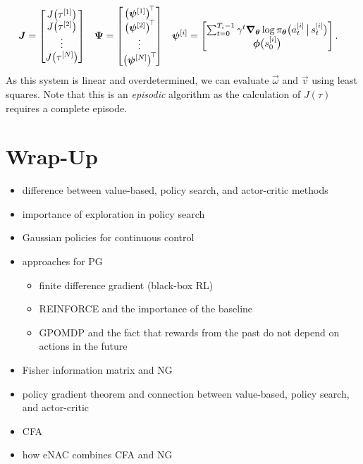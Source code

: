 			\begin{align}
				\bm{J} &= \begin{bmatrix} J\bigl( \tau^{[1]} \bigr) \\ J\bigl( \tau^{[2]} \bigr) \\ \vdots \\ J\bigl( \tau^{[N]} \bigr) \end{bmatrix} &
				\bm{\Psi} &= \begin{bmatrix} \bigl(\bm{\psi}^{[1]}\bigr)^{\!\top\!} \\ \bigl(\bm{\psi}^{[2]}\bigr)^{\!\top\!} \\ \vdots \\ \bigl(\bm{\psi}^{[N]}\bigr)^{\!\top\!} \end{bmatrix} &
				\bm{\psi}^{[i]} &= \begin{bmatrix} \sum_{t = 0}^{T_i - 1} \gamma^t \grad_{\bm{\theta}} \log \pi_{\bm{\theta}}\bigl( a_t^{[i]} \,\big\vert\, s_t^{[i]} \bigr) \\ \bm{\phi}\bigl(s_0^{[i]}\bigr) \end{bmatrix}.
			\end{align}
			As this system is linear and overdetermined, we can evaluate \(\vec{\omega}\) and \(\vec{v}\) using least squares. Note that this is an \emph{episodic} algorithm as the calculation of \(J(\tau)\) requires a complete episode.


	\section{Wrap-Up}
		\begin{itemize}
			\item difference between value-based, policy search, and actor-critic methods
			\item importance of exploration in policy search
			\item Gaussian policies for continuous control
			\item approaches for \acl{PG}
				\begin{itemize}
					\item finite difference gradient (black-box \ac{RL})
					\item REINFORCE and the importance of the baseline
					\item \ac{GPOMDP} and the fact that rewards from the past do not depend on actions in the future
				\end{itemize}
			\item Fisher information matrix and \acl{NG}
			\item policy gradient theorem and connection between value-based, policy search, and actor-critic
			\item \acl{CFA}
			\item how \ac{eNAC} combines \ac{CFA} and \ac{NG}
		\end{itemize}

